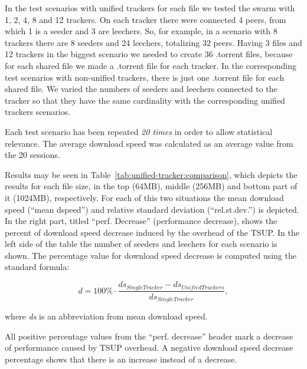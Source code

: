 In the test scenarios with unified trackers for each file we tested the swarm
with 1, 2, 4, 8 and 12 trackers. On each tracker there were connected 4 peers,
from which 1 is a seeder and 3 are leechers. So, for example, in a scenario
with 8 trackers there are 8 seeders and 24 leechers, totalizing 32 peers.
Having 3 files and 12 trackers in the biggest scenario we needed to create 36
.torrent files, because for each shared file we made a .torrent file for each
tracker. In the corresponding test scenarios with non-unified trackers, there
is just one .torrent file for each shared file. We varied the numbers of
seeders and leechers connected to the tracker so that they have the same
cardinality with the corresponding unified trackers scenarios.

Each test scenario has been repeated \textit{20 times} in order to allow
statistical relevance. The average download speed was calculated as an average
value from the 20 sessions.

Results may be seen in Table~\ref{tab:unified-tracker:comparison}, which
depicts the results for each file size, in the top (64MB), middle (256MB) and
bottom part of it (1024MB), respectively. For each of this two situations the
mean download speed (``mean dspeed'') and relative standard deviation
(``rel.st.dev.'') is depicted. In the right part, titled ``perf. Decrease''
(performance decrease), shows the percent of download speed decrease induced
by the overhead of the TSUP. In the left side of the table the number of
seeders and leechers for each scenario is shown. The percentage value for
download speed decrease is computed using the standard formula:


\begin{equation}\label{updates-swarmleader}
d = 100\% \cdot \frac{ds_{SingleTracker} - ds_{UnifiedTrackers}}{ds_{SingleTracker}} ,
\end{equation}


where \textit{ds} is an abbreviation from mean download speed.


All positive percentage values from the ``perf. decrease'' header mark a
decrease of performance caused by TSUP overhead. A negative download speed
decrease percentage shows that there is an increase instead of a decrease.

